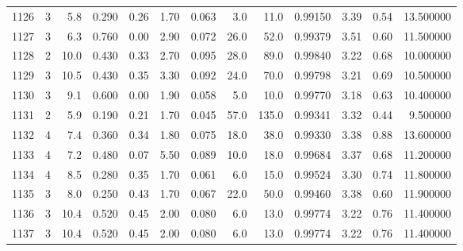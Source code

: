 \begin{tabular}{lrrrrrrrrrrrr}
1126 &        3 &            5.8 &             0.290 &         0.26 &            1.70 &      0.063 &                  3.0 &                  11.0 &  0.99150 &  3.39 &       0.54 &  13.500000 \\
1127 &        3 &            6.3 &             0.760 &         0.00 &            2.90 &      0.072 &                 26.0 &                  52.0 &  0.99379 &  3.51 &       0.60 &  11.500000 \\
1128 &        2 &           10.0 &             0.430 &         0.33 &            2.70 &      0.095 &                 28.0 &                  89.0 &  0.99840 &  3.22 &       0.68 &  10.000000 \\
1129 &        3 &           10.5 &             0.430 &         0.35 &            3.30 &      0.092 &                 24.0 &                  70.0 &  0.99798 &  3.21 &       0.69 &  10.500000 \\
1130 &        3 &            9.1 &             0.600 &         0.00 &            1.90 &      0.058 &                  5.0 &                  10.0 &  0.99770 &  3.18 &       0.63 &  10.400000 \\
1131 &        2 &            5.9 &             0.190 &         0.21 &            1.70 &      0.045 &                 57.0 &                 135.0 &  0.99341 &  3.32 &       0.44 &   9.500000 \\
1132 &        4 &            7.4 &             0.360 &         0.34 &            1.80 &      0.075 &                 18.0 &                  38.0 &  0.99330 &  3.38 &       0.88 &  13.600000 \\
1133 &        4 &            7.2 &             0.480 &         0.07 &            5.50 &      0.089 &                 10.0 &                  18.0 &  0.99684 &  3.37 &       0.68 &  11.200000 \\
1134 &        4 &            8.5 &             0.280 &         0.35 &            1.70 &      0.061 &                  6.0 &                  15.0 &  0.99524 &  3.30 &       0.74 &  11.800000 \\
1135 &        3 &            8.0 &             0.250 &         0.43 &            1.70 &      0.067 &                 22.0 &                  50.0 &  0.99460 &  3.38 &       0.60 &  11.900000 \\
1136 &        3 &           10.4 &             0.520 &         0.45 &            2.00 &      0.080 &                  6.0 &                  13.0 &  0.99774 &  3.22 &       0.76 &  11.400000 \\
1137 &        3 &           10.4 &             0.520 &         0.45 &            2.00 &      0.080 &                  6.0 &                  13.0 &  0.99774 &  3.22 &       0.76 &  11.400000 \\

\end{tabular}
